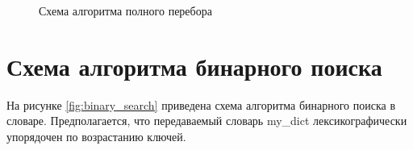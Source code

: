 \clearpage
\begin{figure}[h!]
	
	
	\caption{Схема алгоритма полного перебора}
	
	\label{fig:full_search}
	
\end{figure}


\clearpage
\section{Схема алгоритма бинарного поиска}

На рисунке \ref{fig:binary_search} приведена схема алгоритма бинарного поиска в словаре. Предполагается, что передаваемый словарь my\_dict лексикографически упорядочен по возрастанию ключей.

